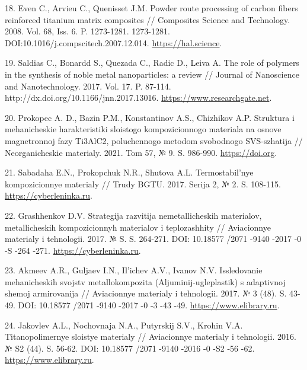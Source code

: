 \begin{references}
18. Even C., Arvieu C., Quenisset J.M. Powder route processing of
carbon fibers reinforced titanium matrix composites // Composites
Science and Technology. 2008. Vol. 68,
Iss. 6. P. 1273-1281. 1273-1281. DOI:10.1016/j.compscitech.2007.12.014. \href{https://hal.science/hal-00550280/document}{https://hal.science}.

19. Saldias C., Bonardd S., Quezada C., Radic D., Leiva A. The role of
polymers in the synthesis of noble metal nanoparticles: a review //
Journal of Nanoscience and
Nanotechnology. 2017. Vol. 17. P. 87-114. http://dx.doi.org/10.1166/jnn.2017.13016. \href{https://www.researchgate.net/publication/302927159_The_Role_of_Polymers_in_the_Synthesis_of_Noble_Metal_Nanoparticles_A_Review}{https://www.researchgate.net}.

20. Prokopec A. D., Bazin P.M., Konstantinov A.S., Chizhikov
A.P. Struktura i mehanicheskie harakteris\-tiki sloistogo
kompozicionnogo materiala na osnove magnetronnoj fazy Ti3AlC2,
poluchennogo metodom svobodnogo SVS-szhatija // Neorganicheskie
materialy. 2021. Tom 57, №
9. S. 986-990. \href{https://doi.org/10.31857/S0002337X2109013X}{https://doi.org}.

21. Sabadaha E.N., Prokopchuk N.R., Shutova A.L. Termostabil'nye
kompozicionnye materialy // Trudy BGTU. 2017. Serija 2, №
2. S. 108-115. \href{https://cyberleninka.ru/article/n/termostabilnye-kompozitsionnye-materialy/viewer}{https://cyberleninka.ru}.

22. Grashhenkov D.V. Strategija razvitija nemetallicheskih materialov,
metallicheskih kompozicionnyh materialov i teplozashhity //
Aviacionnye materialy i tehnologii. 2017. № S. S. 264-271. DOI:
10.18577 /2071 -9140 -2017 -0 -S -264
-271. \href{https://cyberleninka.ru/article/n/strategiya-razvitiya-nemetallicheskih-materialov-metallicheskih-kompozitsionnyh-materialov-i-teplozaschity?ysclid=m82pcgt3m5269227216}{https://cyberleninka.ru}.

23. Akmeev A.R., Guljaev I.N., Il'ichev A.V., Ivanov N.V. Issledovanie
mehanicheskih svojstv metallok\-ompozita (Aljuminij-ugleplastik) s
adaptivnoj shemoj armirovanija // Aviacionnye materialy i
tehnologii. 2017. № 3 (48). S. 43-49. DOI: 10.18577 /2071 -9140 -2017
-0 -3 -43
-49. \href{https://www.elibrary.ru/item.asp?id=29728812&ysclid=m87lxlwmk6845840919}{https://www.elibrary.ru}.

24. Jakovlev A.L., Nochovnaja N.A., Putyrskij S.V., Krohin
V.A. Titanopolimernye sloistye materialy // Aviacionnye materialy i
tehnologii. 2016. № S2 (44). S. 56-62. DOI: 10.18577 /2071 -9140 -2016
-0 -S2 -56
-62. \href{https://www.elibrary.ru/item.asp?id=27022904&ysclid=m87m1shkiq269457456}{https://www.elibrary.ru}.


\end{references}
